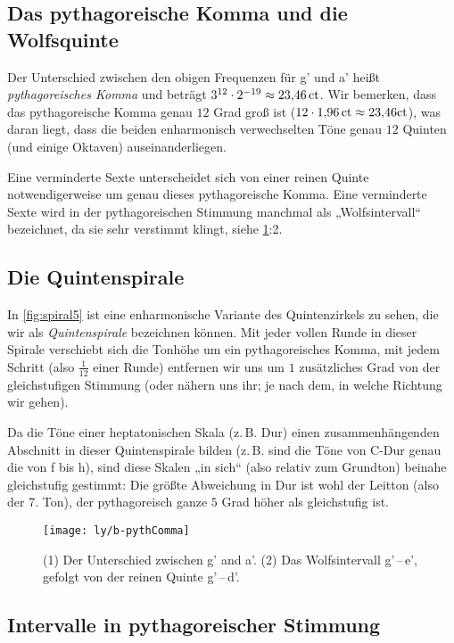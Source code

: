 \subsection{Das pythagoreische Komma und die Wolfsquinte}

Der Unterschied zwischen den obigen Frequenzen für \sharp g' und \flat a' heißt
\emph{pythagoreisches Komma} und beträgt
$3^{12}\cdot 2^{-19}\approx 23{,}46\,\mathrm{ct}$. Wir bemerken, dass das
pythagoreische Komma genau $12$ Grad groß ist
($12\cdot 1{,}96\,\mathrm{ct}\approx 23{,}46\mathrm{ct}$), was daran liegt, dass die
beiden enharmonisch verwechselten Töne genau $12$ Quinten (und einige Oktaven)
auseinanderliegen.

Eine verminderte Sexte unterscheidet sich von einer reinen Quinte
notwendigerweise um genau dieses pythagoreische Komma. Eine verminderte Sexte
wird in der pythagoreischen Stimmung manchmal als „Wolfsintervall“ bezeichnet,
da sie sehr verstimmt klingt, siehe \cref{fig:pythComma}:2.

\subsection{Die Quintenspirale}

In \cref{fig:spiral5} ist eine enharmonische Variante des Quintenzirkels zu
sehen, die wir als \emph{Quintenspirale} bezeichnen können. Mit jeder vollen
Runde in dieser Spirale verschiebt sich die Tonhöhe um ein pythagoreisches
Komma, mit jedem Schritt (also $\frac1{12}$ einer Runde) entfernen wir uns um
$1$ zusätzliches Grad von der gleichstufigen Stimmung (oder nähern uns ihr; je
nach dem, in welche Richtung wir gehen).

Da die Töne einer heptatonischen Skala (z.\,B. Dur) einen zusammenhängenden
Abschnitt in dieser Quintenspirale bilden (z.\,B. sind die Töne von C-Dur genau
die von f bis h), sind diese Skalen „in sich“ (also relativ zum Grundton)
beinahe gleichstufig gestimmt: Die größte Abweichung in Dur ist wohl der Leitton
(also der 7. Ton), der pythagoreisch ganze $5$ Grad höher als gleichstufig ist.

\begin{figure}[h]
  \centering
  \texttt{[image: ly/b-pythComma]}
  \caption{(1) Der Unterschied zwischen \sharp g’ and \flat a’. (2) Das
    Wolfsintervall \sharp g’\,–\,\flat e’, gefolgt von der reinen Quinte \sharp
    g’\,–\,\sharp d’.}\label{fig:pythComma}
\end{figure}

\subsection{Intervalle in pythagoreischer Stimmung}

